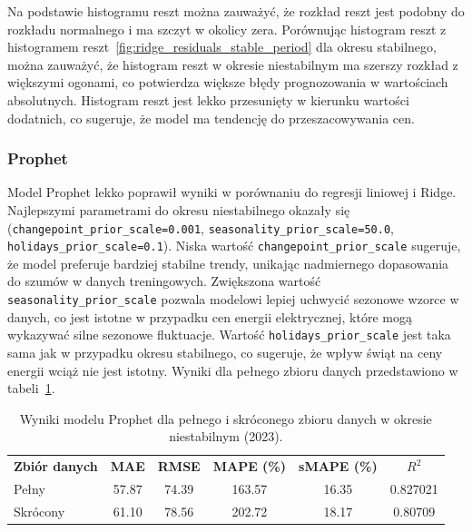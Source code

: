 Na podstawie histogramu reszt można zauważyć, że rozkład reszt jest podobny do rozkładu normalnego i ma szczyt w okolicy zera. Porównując histogram reszt z histogramem reszt~\ref{fig:ridge_residuals_stable_period} dla okresu stabilnego, można zauważyć, że histogram reszt w okresie niestabilnym ma szerszy rozkład z większymi ogonami, co potwierdza większe błędy prognozowania w wartościach absolutnych. Histogram reszt jest lekko przesunięty w kierunku wartości dodatnich, co sugeruje, że model ma tendencję do przeszacowywania cen.

\subsubsection{Prophet}

Model Prophet lekko poprawił wyniki w porównaniu do regresji liniowej i Ridge. Najlepszymi parametrami do okresu niestabilnego okazały się (\texttt{changepoint\_prior\_scale=0.001}, \texttt{seasonality\_prior\_scale=50.0}, \texttt{holidays\_prior\_scale=0.1}). Niska wartość {\texttt{changepoint\_prior\_scale}} sugeruje, że model preferuje bardziej stabilne trendy, unikając nadmiernego dopasowania do szumów w danych treningowych. Zwiększona wartość {\texttt{seasonality\_prior\_scale}} pozwala modelowi lepiej uchwycić sezonowe wzorce w danych, co jest istotne w przypadku cen energii elektrycznej, które mogą wykazywać silne sezonowe fluktuacje. Wartość {\texttt{holidays\_prior\_scale}} jest taka sama jak w przypadku okresu stabilnego, co sugeruje, że wpływ świąt na ceny energii wciąż nie jest istotny. Wyniki dla pełnego zbioru danych przedstawiono w tabeli~\ref{tab:prophet_results_combined_nonstable}.

\begin{table}[H]
    \centering
    \caption{Wyniki modelu Prophet dla pełnego i skróconego zbioru danych w okresie niestabilnym (2023).}
    \label{tab:prophet_results_combined_nonstable}
    \begin{tabular}{|l|ccccc|}
        \hline
            \textbf{Zbiór danych} & \textbf{MAE} & \textbf{RMSE} & \textbf{MAPE (\%)} & \textbf{sMAPE (\%)} & \textbf{\(R^2\)} \\
            Pełny     & 57.87 & 74.39 & 163.57 & 16.35 & 0.827021 \\
            Skrócony  & 61.10 & 78.56 & 202.72 & 18.17 & 0.80709 \\
            \hline
    \end{tabular}
\end{table}

